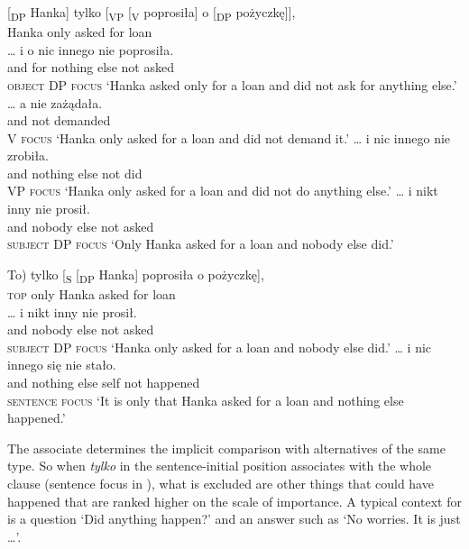 \documentclass[output=paper,colorlinks,citecolor=brown]{langscibook}
\begin{document}
\ea\label{ex:tom:18}
\gll {}[\textsubscript{DP} Hanka]   tylko [\textsubscript{VP} [\textsubscript{V} poprosiła]   o       [\textsubscript{DP} pożyczkę]],    \\
{} Hanka only {} {} asked for {} loan \\  
\ea\label{ex:tom:18a} 
\gll  … i o nic innego nie poprosiła.\\    
{} and for nothing else not asked\\\hfill \textsc{object} \textsc{DP} \textsc{focus} 
\glt `Hanka asked only for a loan and did not ask for anything else.’ \\
\ex\label{ex:tom:18b}
\gll … a nie zażądała.\\
{} and not demanded\\\hfill \textsc{V} \textsc{focus}
\glt `Hanka only asked for a loan and did not demand it.’
\ex\label{ex:tom:18c}
\gll … i nic innego nie zrobiła.\\
{} and nothing else not did\\\hfill \textsc{VP} \textsc{focus}
\glt `Hanka only asked for a loan and did not do anything else.’
\ex\label{ex:tom:18d}      
\gll … i nikt inny nie prosił.\\
 {} and nobody else not asked\\\hfill \textsc{subject DP focus}
\glt `Only Hanka asked for a loan and nobody else did.’
\z 
\z 

\ea\label{ex:tom:19}
\gll \minsp{(} To) tylko [\textsubscript{S} [\textsubscript{DP} Hanka] poprosiła o pożyczkę],\\    
{} \textsc{top} only {} {} Hanka asked for loan\\      
\ea\label{ex:tom:19a}
\gll … i nikt inny nie prosił.\\
{} and nobody else not asked\\\hfill \textsc{subject} \textsc{DP} \textsc{focus}
\glt `Hanka only asked for a loan and nobody else did.’ 
\ex\label{ex:tom:19b} 
\gll … i nic innego się nie stało.\\                
{} and nothing else self not happened\\\hfill \textsc{sentence} \textsc{focus}
\glt `It is only that Hanka asked for a loan and nothing else happened.’
\z 
\z 

\noindent The associate determines the implicit comparison with alternatives of the same type. So when \textit{tylko} in the sentence-initial position associates with the whole clause (sentence focus in ), what is excluded are other things that could have happened that are ranked higher on the scale of importance. A typical context for  is a question ‘Did anything happen?’ and an answer such as ‘No worries. It is just …’. 
\end{document}
